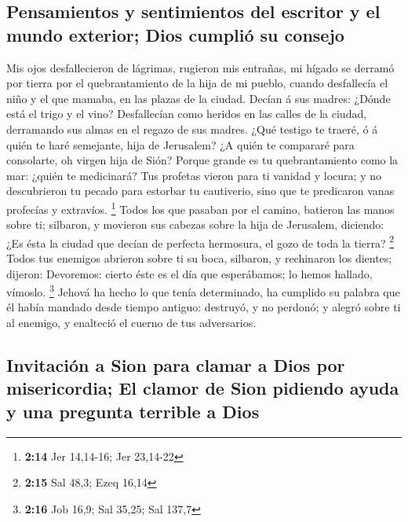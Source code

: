 \hypertarget{pensamientos-y-sentimientos-del-escritor-y-el-mundo-exterior-dios-cumpliuxf3-su-consejo}{%
\subsection{Pensamientos y sentimientos del escritor y el mundo
exterior; Dios cumplió su
consejo}\label{pensamientos-y-sentimientos-del-escritor-y-el-mundo-exterior-dios-cumpliuxf3-su-consejo}}

 Mis ojos desfallecieron de lágrimas, rugieron mis
entrañas, mi hígado se derramó por tierra por el quebrantamiento de la
hija de mi pueblo, cuando desfallecía el niño y el que mamaba, en las
plazas de la ciudad.  Decían á sus madres: ¿Dónde está el
trigo y el vino? Desfallecían como heridos en las calles de la ciudad,
derramando sus almas en el regazo de sus madres.  ¿Qué
testigo te traeré, ó á quién te haré semejante, hija de Jerusalem? ¿A
quién te compararé para consolarte, oh virgen hija de Sión? Porque
grande es tu quebrantamiento como la mar: ¿quién te medicinará?
 Tus profetas vieron para ti vanidad y locura; y no
descubrieron tu pecado para estorbar tu cautiverio, sino que te
predicaron vanas profecías y extravíos. \footnote{\textbf{2:14} Jer
  14,14-16; Jer 23,14-22}  Todos los que pasaban por el
camino, batieron las manos sobre ti; silbaron, y movieron sus cabezas
sobre la hija de Jerusalem, diciendo: ¿Es ésta la ciudad que decían de
perfecta hermosura, el gozo de toda la tierra? \footnote{\textbf{2:15}
  Sal 48,3; Ezeq 16,14}  Todos tus enemigos abrieron
sobre ti su boca, silbaron, y rechinaron los dientes; dijeron:
Devoremos: cierto éste es el día que esperábamos; lo hemos hallado,
vímoslo. \footnote{\textbf{2:16} Job 16,9; Sal 35,25; Sal 137,7}
 Jehová ha hecho lo que tenía determinado, ha cumplido su
palabra que él había mandado desde tiempo antiguo: destruyó, y no
perdonó; y alegró sobre ti al enemigo, y enalteció el cuerno de tus
adversarios.

\hypertarget{invitaciuxf3n-a-sion-para-clamar-a-dios-por-misericordia-el-clamor-de-sion-pidiendo-ayuda-y-una-pregunta-terrible-a-dios}{%
\subsection{Invitación a Sion para clamar a Dios por misericordia; El
clamor de Sion pidiendo ayuda y una pregunta terrible a
Dios}\label{invitaciuxf3n-a-sion-para-clamar-a-dios-por-misericordia-el-clamor-de-sion-pidiendo-ayuda-y-una-pregunta-terrible-a-dios}}

